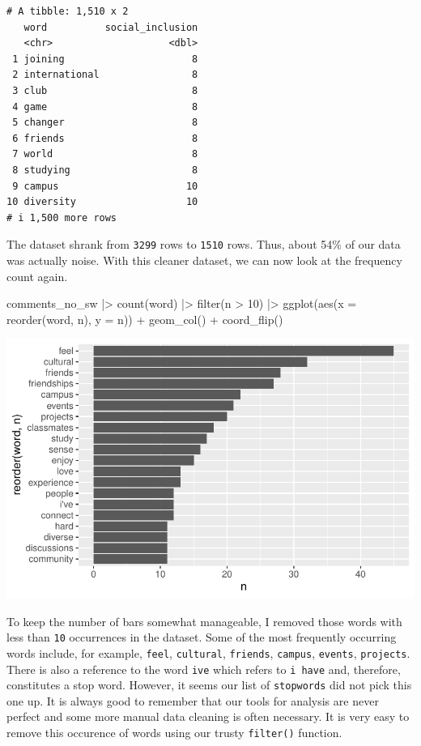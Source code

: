 \documentclass[
  letterpaper,
  DIV=11,
  numbers=noendperiod]{scrreprt}
\newenvironment{Shaded}{\begin{snugshade}}{\end{snugshade}}
\newcommand{\AttributeTok}[1]{\textcolor[rgb]{0.40,0.45,0.13}{#1}}
\newcommand{\DecValTok}[1]{\textcolor[rgb]{0.68,0.00,0.00}{#1}}
\newcommand{\FunctionTok}[1]{\textcolor[rgb]{0.28,0.35,0.67}{#1}}
\newcommand{\NormalTok}[1]{\textcolor[rgb]{0.00,0.23,0.31}{#1}}
\newcommand{\SpecialCharTok}[1]{\textcolor[rgb]{0.37,0.37,0.37}{#1}}
\begin{document}
\begin{verbatim}
# A tibble: 1,510 x 2
   word          social_inclusion
   <chr>                    <dbl>
 1 joining                      8
 2 international                8
 3 club                         8
 4 game                         8
 5 changer                      8
 6 friends                      8
 7 world                        8
 8 studying                     8
 9 campus                      10
10 diversity                   10
# i 1,500 more rows
\end{verbatim}

The dataset shrank from \texttt{3299} rows to \texttt{1510} rows. Thus,
about 54\% of our data was actually noise. With this cleaner dataset, we
can now look at the frequency count again.

\begin{Shaded}
\begin{Highlighting}[]
\NormalTok{comments\_no\_sw }\SpecialCharTok{|\textgreater{}}
  \FunctionTok{count}\NormalTok{(word) }\SpecialCharTok{|\textgreater{}}
  \FunctionTok{filter}\NormalTok{(n }\SpecialCharTok{\textgreater{}} \DecValTok{10}\NormalTok{) }\SpecialCharTok{|\textgreater{}}
  \FunctionTok{ggplot}\NormalTok{(}\FunctionTok{aes}\NormalTok{(}\AttributeTok{x =} \FunctionTok{reorder}\NormalTok{(word, n),}
             \AttributeTok{y =}\NormalTok{ n)) }\SpecialCharTok{+}
  \FunctionTok{geom\_col}\NormalTok{() }\SpecialCharTok{+}
  \FunctionTok{coord\_flip}\NormalTok{()}
\end{Highlighting}
\end{Shaded}

\includegraphics{14_mixed_methods_files/figure-pdf/freq-after-stopwords-removal-1.pdf}

To keep the number of bars somewhat manageable, I removed those words
with less than \texttt{10} occurrences in the dataset. Some of the most
frequently occurring words include, for example, \texttt{feel},
\texttt{cultural}, \texttt{friends}, \texttt{campus}, \texttt{events},
\texttt{projects}. There is also a reference to the word
\texttt{i\textquotesingle{}ve} which refers to \texttt{i\ have} and,
therefore, constitutes a stop word. However, it seems our list of
\texttt{stopwords} did not pick this one up. It is always good to
remember that our tools for analysis are never perfect and some more
manual data cleaning is often necessary. It is very easy to remove this
occurence of words using our trusty \texttt{filter()} function.
\end{document}
